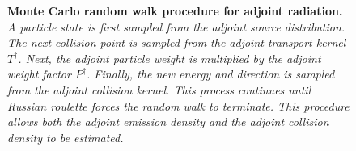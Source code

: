 \begin{figure}[t!]
  \begin{center}
    \end{center}
  \caption{\textbf{Monte Carlo random walk procedure for adjoint radiation.}
    \textit{A particle state is first sampled from the adjoint source 
      distribution. The next collision point is sampled from the adjoint 
      transport kernel $T^{\dagger}$. Next, the adjoint particle weight is
      multiplied by the adjoint weight factor $P^{\dagger}$. Finally, the new 
      energy and direction is sampled from the adjoint collision kernel. This
      process continues until Russian roulette forces the random walk to
      terminate. This procedure allows both the adjoint emission density and 
      the adjoint collision density to be estimated.}}
  \label{fig:combined_adj_random_walk_process}
\end{figure}

